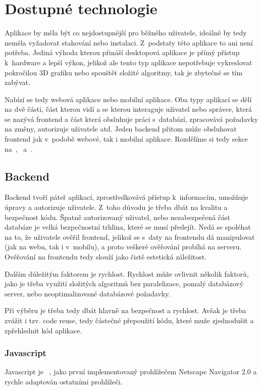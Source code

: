 \section{Dostupné technologie}
\label{sc:available_technologies}
Aplikace by měla být co nejdostupnější pro běžného uživatele, ideálně by tedy neměla vyžadovat stahování nebo instalaci. Z~podstaty této aplikace to ani není potřeba. Jediná výhoda kterou přináší desktopová aplikace je přímý přístup k~hardware a lepší výkon, jelikož ale tento typ aplikace nepotřebuje vykreslovat pokročilou 3D grafiku nebo spouštět složité algoritmy, tak je zbytečné se tím zabývat.

Nabízí se tedy webová aplikace nebo mobilní aplikace. Oba typy aplikací se dělí na dvě části, část kterou vidí a se kterou interaguje uživatel nebo správce, která se nazývá frontend a část která obsluhuje práci s~databází, zpracovává požadavky na změny, autorizuje uživatele atd. Jeden backend přitom může obsluhovat frontend jak v~podobě webové, tak i mobilní aplikace. Rozdělíme si tedy sekce na~,~ a~.

\subsection{Backend}
\label{ss:backend}
Backend tvoří páteř aplikací, zprostředkovává přístup k~informacím, umožňuje úpravy a autorizuje uživatele. Z~toho důvodu je třeba dbát na kvalitu a bezpečnost kódu. Špatně autorizovaný uživatel, nebo nezabezpečená část databáze je velká bezpečnostní trhlina, které se musí předejít. Nedá se spoléhat na to, že uživatele ověřil frontend, jelikož se s~daty na frontendu dá manipulovat (jak na webu, tak i v~mobilu), a proto veškeré ověřování probíhá na serveru. Ověřování na frontendu tedy slouží jako čistě estetická záležitost.

Dalším důležitým faktorem je rychlost. Rychlost může ovlivnit několik faktorů, jako je třeba využití složitých algoritmů bez paralelizace, pomalý databázový server, nebo neoptimalizované databázové požadavky.

Při výběru je třeba tedy dbát hlavně na bezpečnost a rychlost. Avšak je třeba zvážit i tzv. code reuse, tedy částečné přepoužití kódu, které muže zjednodušit a zpřehlednit kód aplikace.

\subsubsection*{Javascript}
Javascript je \emph{}~\cite{netscapecommunicationscorporation_1995_press}, jako první implementovaný prohlížečem Netscape Navigator 2.0 a rychle adaptován ostatními prohlížeči.

